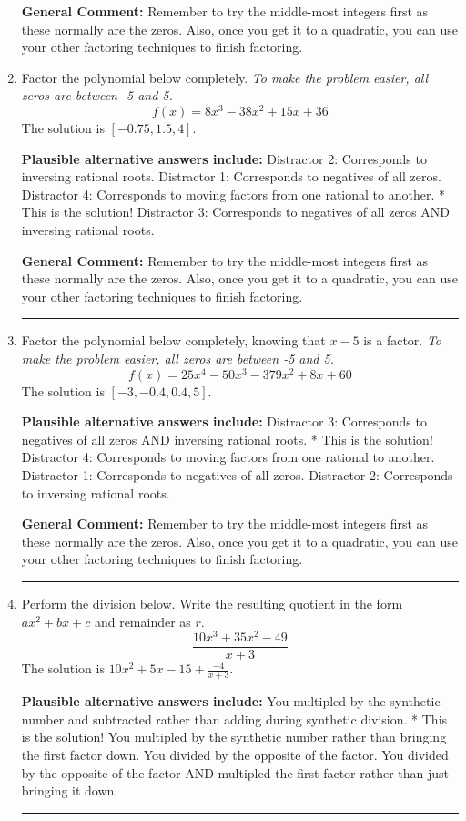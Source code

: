 \documentclass{extbook}[14pt]
\newcommand{\litem}[1]{\item #1

\rule{\textwidth}{0.4pt}}
\begin{document}
\begin{enumerate}
{\textbf{General Comment:} Remember to try the middle-most integers first as these normally are the zeros. Also, once you get it to a quadratic, you can use your other factoring techniques to finish factoring.
}
\litem{
Factor the polynomial below completely. \textit{To make the problem easier, all zeros are between -5 and 5.}
\[ f(x) = 8x^{3} -38 x^{2} +15 x + 36 \]The solution is \( [-0.75, 1.5, 4] \).\begin{enumerate}[label=\Alph*.]
\textbf{Plausible alternative answers include:} Distractor 2: Corresponds to inversing rational roots.
 Distractor 1: Corresponds to negatives of all zeros.
 Distractor 4: Corresponds to moving factors from one rational to another.
* This is the solution!
 Distractor 3: Corresponds to negatives of all zeros AND inversing rational roots.
\end{enumerate}

\textbf{General Comment:} Remember to try the middle-most integers first as these normally are the zeros. Also, once you get it to a quadratic, you can use your other factoring techniques to finish factoring.
}
\litem{
Factor the polynomial below completely, knowing that $x -5$ is a factor. \textit{To make the problem easier, all zeros are between -5 and 5.}
\[ f(x) = 25x^{4} -50 x^{3} -379 x^{2} +8 x + 60 \]The solution is \( [-3, -0.4, 0.4, 5] \).\begin{enumerate}[label=\Alph*.]
\textbf{Plausible alternative answers include:} Distractor 3: Corresponds to negatives of all zeros AND inversing rational roots.
* This is the solution!
 Distractor 4: Corresponds to moving factors from one rational to another.
 Distractor 1: Corresponds to negatives of all zeros.
 Distractor 2: Corresponds to inversing rational roots.
\end{enumerate}

\textbf{General Comment:} Remember to try the middle-most integers first as these normally are the zeros. Also, once you get it to a quadratic, you can use your other factoring techniques to finish factoring.
}
\litem{
Perform the division below. Write the resulting quotient in the form $ax^2+bx+c$ and remainder as $r$.
\[ \frac{10x^{3} +35 x^{2} -49}{x + 3} \]The solution is \( 10x^{2} +5 x -15 + \frac{-4}{x + 3} \).\begin{enumerate}[label=\Alph*.]
\textbf{Plausible alternative answers include:} You multipled by the synthetic number and subtracted rather than adding during synthetic division.
* This is the solution!
 You multipled by the synthetic number rather than bringing the first factor down.
 You divided by the opposite of the factor.
 You divided by the opposite of the factor AND multipled the first factor rather than just bringing it down.
\end{enumerate}

}
\end{enumerate}
\end{document}
